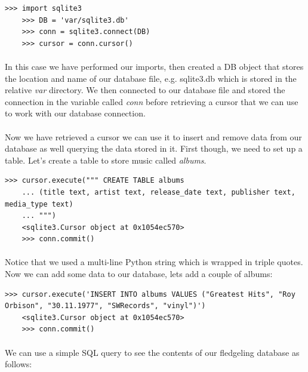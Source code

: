 \documentclass[12pt, a4paper, oneside]{book}
\begin{document}
{\begin{lstlisting}[style=DOS]
    >>> import sqlite3
    >>> DB = 'var/sqlite3.db'
    >>> conn = sqlite3.connect(DB)
    >>> cursor = conn.cursor()
\end{lstlisting}

\paragraph{} In this case we have performed our imports, then created a DB object that stores the location and name of our database file, e.g. sqlite3.db which is stored in the relative \emph{var} directory. We then connected to our database file and stored the connection in the variable called \emph{conn} before retrieving a cursor that we can use to work with our database connection.

\paragraph{} Now we have retrieved a cursor we can use it to insert and remove data from our database as well querying the data stored in it. First though, we need to set up a table. Let's create a table to store music called \emph{albums}.

\begin{lstlisting}[style=DOS]
    >>> cursor.execute(""" CREATE TABLE albums
    ... (title text, artist text, release_date text, publisher text, media_type text)
    ... """)
    <sqlite3.Cursor object at 0x1054ec570>
    >>> conn.commit()
\end{lstlisting}

\paragraph{} Notice that we used a multi-line Python string which is wrapped in triple quotes. Now we can add some data to our database, lets add a couple of albums:

\begin{lstlisting}[style=DOS]
    >>> cursor.execute('INSERT INTO albums VALUES ("Greatest Hits", "Roy Orbison", "30.11.1977", "SWRecords", "vinyl")')
    <sqlite3.Cursor object at 0x1054ec570>
    >>> conn.commit()
\end{lstlisting}

\paragraph{} We can use a simple SQL query to see the contents of our fledgeling database as follows:

}
\end{document}
